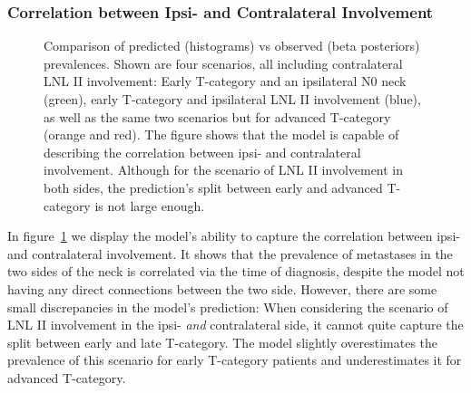 \documentclass[
  sn-mathphys-num,
]{sn-jnl}
\begin{document}
\subsubsection{Correlation between Ipsi- and Contralateral
Involvement}\label{correlation-between-ipsi--and-contralateral-involvement}

\begin{figure}


\caption{\label{fig-model-prevalences-with-ipsi}Comparison of predicted
(histograms) vs observed (beta posteriors) prevalences. Shown are four
scenarios, all including contralateral LNL II involvement: Early
T-category and an ipsilateral N0 neck (green), early T-category and
ipsilateral LNL II involvement (blue), as well as the same two scenarios
but for advanced T-category (orange and red). The figure shows that the
model is capable of describing the correlation between ipsi- and
contralateral involvement. Although for the scenario of LNL II
involvement in both sides, the prediction's split between early and
advanced T-category is not large enough.}

\end{figure}%

In figure~\ref{fig-model-prevalences-with-ipsi} we display the model's
ability to capture the correlation between ipsi- and contralateral
involvement. It shows that the prevalence of metastases in the two sides
of the neck is correlated via the time of diagnosis, despite the model
not having any direct connections between the two side. However, there
are some small discrepancies in the model's prediction: When considering
the scenario of LNL II involvement in the ipsi- \emph{and} contralateral
side, it cannot quite capture the split between early and late
T-category. The model slightly overestimates the prevalence of this
scenario for early T-category patients and underestimates it for
advanced T-category.
\end{document}
